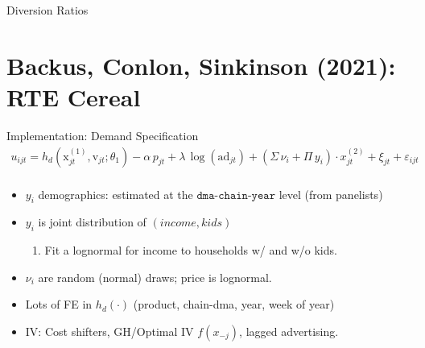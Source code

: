 \begin{frame}{Diversion Ratios}
\begin{center}
\scalebox{0.6}{
 
}
\end{center}
\end{frame}


\section*{Backus, Conlon, Sinkinson (2021): RTE Cereal}

\begin{frame}{Implementation: Demand Specification}
\begin{gather*}
u_{ijt} =  h_d(\textrm{x}_{jt}^{(1)}, \textrm{v}_{jt}; \theta_1) - \alpha\, p_{jt} + \lambda \, \log(\text{ad}_{jt})  + \left(\Sigma \, \nu_i + \Pi\, y_i \right) \cdot x_{jt}^{(2)}+ \xi_{jt} + \varepsilon_{ijt}\\
\end{gather*}
\vspace{-0.75cm}
\begin{itemize}
\item $y_i$ demographics: estimated at the $\texttt{dma-chain-year}$ level (from panelists)
\item $y_i$ is joint distribution of $(income, kids)$
\begin{enumerate}
\item Fit a lognormal for income to households w/ and w/o kids.
\end{enumerate}
\item $\nu_i$ are random (normal) draws; price is lognormal.
\item Lots of FE in $h_d(\cdot)$ (product, chain-dma, year, week of year)
\item IV: Cost shifters, GH/Optimal IV $f(x_{-j})$, lagged advertising.
\end{itemize}
\end{frame}


